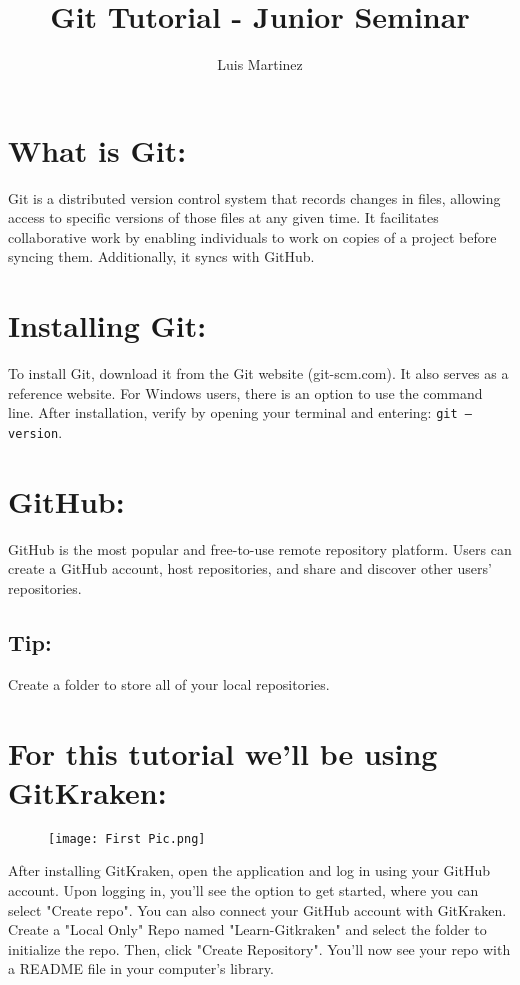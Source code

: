 \documentclass[10pt,twocolumn]{article}
\title{Git Tutorial - Junior Seminar}
\author{Luis Martinez}
\affiliation{Occidental College}
\begin{document}
\maketitle

\section{What is Git:}

Git is a distributed version control system that records changes in files, allowing access to specific versions of those files at any given time. It facilitates collaborative work by enabling individuals to work on copies of a project before syncing them. Additionally, it syncs with GitHub.

\section{Installing Git:}

To install Git, download it from the Git website (git-scm.com). It also serves as a reference website. For Windows users, there is an option to use the command line. After installation, verify by opening your terminal and entering: \texttt{git --version}.

\section{GitHub:}

GitHub is the most popular and free-to-use remote repository platform. Users can create a GitHub account, host repositories, and share and discover other users' repositories.

\subsection{Tip:}

Create a folder to store all of your local repositories.

\section{For this tutorial we'll be using GitKraken:}

\begin{figure}[htbp]
\centering
\texttt{[image: First Pic.png]}
\label{fig:my_label}
\end{figure}

After installing GitKraken, open the application and log in using your GitHub account. Upon logging in, you'll see the option to get started, where you can select "Create repo". You can also connect your GitHub account with GitKraken. Create a "Local Only" Repo named "Learn-Gitkraken" and select the folder to initialize the repo. Then, click "Create Repository". You'll now see your repo with a README file in your computer's library.
\end{document}

